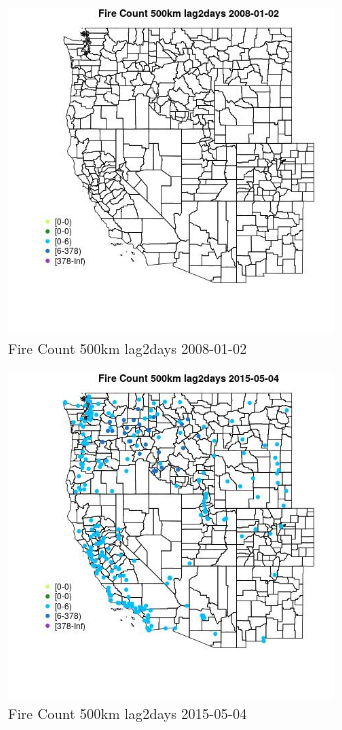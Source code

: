 \begin{figure} 
\centering  
\includegraphics[width=0.77\textwidth]{Code_Outputs/Report_ML_input_PM25_Step4_part_e_de_duplicated_aves_compiled_2019-05-18wNAs_MapObsFire_Count_500km_lag2days2008-01-02.jpg} 
\caption{\label{fig:Report_ML_input_PM25_Step4_part_e_de_duplicated_aves_compiled_2019-05-18wNAsMapObsFire_Count_500km_lag2days2008-01-02}Fire Count 500km lag2days 2008-01-02} 
\end{figure} 
 

\begin{figure} 
\centering  
\includegraphics[width=0.77\textwidth]{Code_Outputs/Report_ML_input_PM25_Step4_part_e_de_duplicated_aves_compiled_2019-05-18wNAs_MapObsFire_Count_500km_lag2days2015-05-04.jpg} 
\caption{\label{fig:Report_ML_input_PM25_Step4_part_e_de_duplicated_aves_compiled_2019-05-18wNAsMapObsFire_Count_500km_lag2days2015-05-04}Fire Count 500km lag2days 2015-05-04} 
\end{figure} 
 

